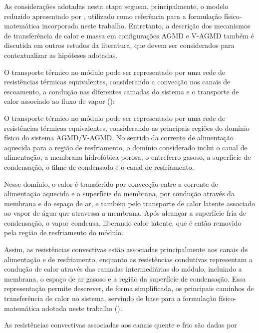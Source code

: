 As considerações adotadas nesta etapa seguem, principalmente, o modelo reduzido apresentado por \cite{Lisboa2024}, utilizado como referência para a formulação físico-matemática incorporada neste trabalho. Entretanto, a descrição dos mecanismos de transferência de calor e massa em configurações AGMD e V-AGMD também é discutida em outros estudos da literatura, que devem ser considerados para contextualizar as hipóteses adotadas.


O transporte térmico no módulo pode ser representado por uma rede de resistências térmicas equivalentes, considerando a convecção nos canais de escoamento, a condução nas diferentes camadas do sistema e o transporte de calor associado ao fluxo de vapor (\cite{Lisboa2024}):

O transporte térmico no módulo pode ser representado por uma rede de resistências térmicas equivalentes, considerando as principais regiões do domínio físico do sistema AGMD/V-AGMD. No sentido da corrente de alimentação aquecida para a região de resfriamento, o domínio considerado inclui o canal de alimentação, a membrana hidrofóbica porosa, o entreferro gasoso, a superfície de condensação, o filme de condensado e o canal de resfriamento.

Nesse domínio, o calor é transferido por convecção entre a corrente de alimentação aquecida e a superfície da membrana, por condução através da membrana e do espaço de ar, e também pelo transporte de calor latente associado ao vapor de água que atravessa a membrana. Após alcançar a superfície fria de condensação, o vapor condensa, liberando calor latente, que é então removido pela região de resfriamento do módulo.

Assim, as resistências convectivas estão associadas principalmente aos canais de alimentação e de resfriamento, enquanto as resistências condutivas representam a condução de calor através das camadas intermediárias do módulo, incluindo a membrana, o espaço de ar gasoso e a região da superfície de condensação. Essa representação permite descrever, de forma simplificada, os principais caminhos de transferência de calor no sistema, servindo de base para a formulação físico-matemática adotada neste trabalho (\cite{Lisboa2024}).

As resistências convectivas associadas aos canais quente e frio são dadas por

